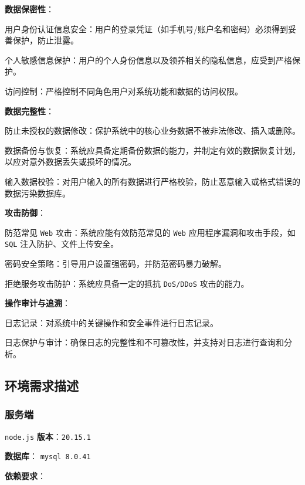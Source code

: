 \documentclass[12pt,a4paper,UTF8]{article}
\begin{document}
\noindent\textbf{数据保密性}：

用户身份认证信息安全：用户的登录凭证（如手机号/账户名和密码）必须得到妥善保护，防止泄露。

个人敏感信息保护：用户的个人身份信息以及领养相关的隐私信息，应受到严格保护。

访问控制：严格控制不同角色用户对系统功能和数据的访问权限。

\vspace{0.25cm}

\noindent\textbf{数据完整性}：

防止未授权的数据修改：保护系统中的核心业务数据不被非法修改、插入或删除。

数据备份与恢复：系统应具备定期备份数据的能力，并制定有效的数据恢复计划，以应对意外数据丢失或损坏的情况。

输入数据校验：对用户输入的所有数据进行严格校验，防止恶意输入或格式错误的数据污染数据库。

\vspace{0.25cm}

\noindent\textbf{攻击防御}：

防范常见 \verb|Web| 攻击：系统应能有效防范常见的 \verb|Web| 应用程序漏洞和攻击手段，如 \verb|SQL| 注入防护、文件上传安全。

密码安全策略：引导用户设置强密码，并防范密码暴力破解。

拒绝服务攻击防护：系统应具备一定的抵抗 \verb|DoS/DDoS| 攻击的能力。

\vspace{0.25cm}

\noindent\textbf{操作审计与追溯}：

日志记录：对系统中的关键操作和安全事件进行日志记录。

日志保护与审计：确保日志的完整性和不可篡改性，并支持对日志进行查询和分析。

\subsection{环境需求描述}

\subsubsection{服务端}

\verb|node.js| \textbf{版本}：\verb|20.15.1|

\textbf{数据库}： \verb|mysql 8.0.41|

\textbf{依赖要求}： 

\vspace{0.25cm} %
\end{document}
